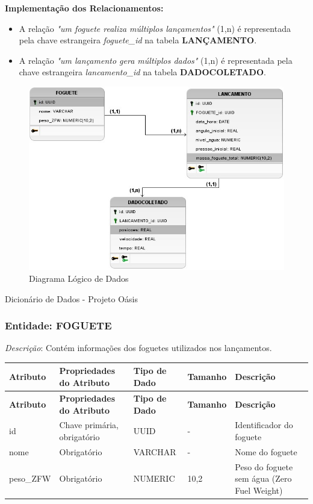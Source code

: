 \textbf{Implementação dos Relacionamentos:}
\begin{itemize}
  \item A relação \textit{"um foguete realiza múltiplos lançamentos"} (1,n) é representada pela chave estrangeira \textit{foguete\_id} na tabela \textbf{LANÇAMENTO}.

  \item A relação \textit{"um lançamento gera múltiplos dados"} (1,n) é representada pela chave estrangeira \textit{lancamento\_id} na tabela \textbf{DADOCOLETADO}.
\end{itemize}

\begin{figure}[H]
\centering
\includegraphics[width=1\linewidth]{editaveis/figuras/diagrama_LogicoDados.png}
\caption{Diagrama Lógico de Dados}
\label{fig:dld}
\end{figure}


\renewcommand{\arraystretch}{1.2}

Dicionário de Dados - Projeto Oásis

\subsubsection*{Entidade: FOGUETE}  
\textit{Descrição}: Contém informações dos foguetes utilizados nos lançamentos.  

\begin{longtable}{|p{2.5cm}|p{3.5cm}|p{2cm}|p{1.8cm}|p{4cm}|}
\hline
\textbf{Atributo} & \textbf{Propriedades do Atributo} & \textbf{Tipo de Dado} & \textbf{Tamanho} & \textbf{Descrição} \\
\hline
\endfirsthead

\hline
\textbf{Atributo} & \textbf{Propriedades do Atributo} & \textbf{Tipo de Dado} & \textbf{Tamanho} & \textbf{Descrição} \\
\hline
\endhead

id & Chave primária, obrigatório & UUID & - & Identificador do foguete \\
\hline
nome & Obrigatório & VARCHAR & - & Nome do foguete \\
\hline
peso\_ZFW & Obrigatório & NUMERIC & 10,2 & Peso do foguete sem água (Zero Fuel Weight) \\
\hline
\end{longtable}

